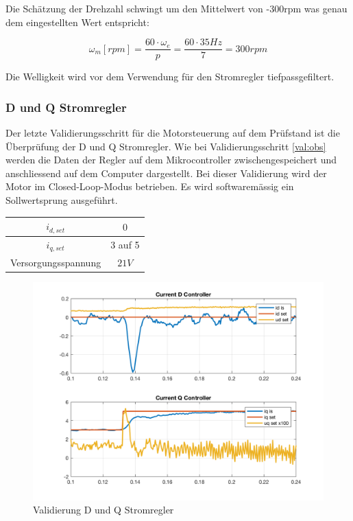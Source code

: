 Die Schätzung der Drehzahl schwingt um den Mittelwert von -300rpm was genau dem eingestellten Wert entspricht:

\begin{equation}
	\omega_m [rpm] = \frac{60 \cdot \omega_e}{p} = \frac{60 \cdot 35Hz}{7} = 300rpm
\end{equation}

Die Welligkeit wird vor dem Verwendung für den Stromregler tiefpassgefiltert.

\subsubsection*{D und Q Stromregler}
Der letzte Validierungsschritt für die Motorsteuerung auf dem Prüfstand ist die Überprüfung der D und Q Stromregler. Wie bei Validierungsschritt \ref{val:obs} werden die Daten der Regler auf dem Mikrocontroller zwischengespeichert und anschliessend auf dem Computer dargestellt. Bei dieser Validierung wird der Motor im Closed-Loop-Modus betrieben. Es wird softwaremässig ein Sollwertsprung ausgeführt.

\begin{center}
	\begin{tabular}{|c|c|}
		\hline 
		$i_{d,set}$ & $0$ \\ \hline
		$i_{q,set}$ & 3 auf 5 \\ \hline
		Versorgungsspannung & $21V$ \\ \hline
	\end{tabular} 
	\label{tab:regmessbed}
\end{center}

\begin{figure} [H]
	\centering
	\includegraphics[width=0.8\linewidth]{images/valmccontrollers.png}
	\caption{Validierung D und Q Stromregler}
	\label{fig:reg}
\end{figure}

